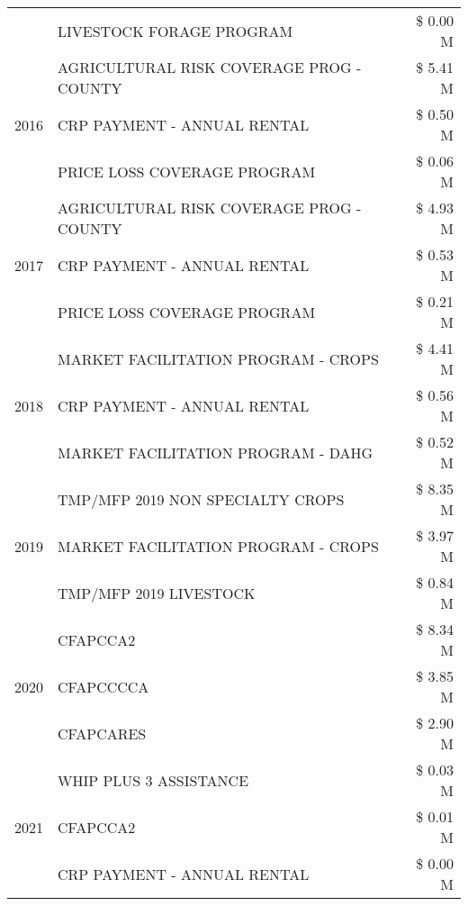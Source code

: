 \begin{tabular}{llr}
 & LIVESTOCK FORAGE PROGRAM & \$ 0.00 M \\
\cline{1-3}
\multirow[t]{3}{*}{2016} & AGRICULTURAL RISK COVERAGE PROG - COUNTY      & \$ 5.41 M \\
 & CRP PAYMENT - ANNUAL RENTAL                   & \$ 0.50 M \\
 & PRICE LOSS COVERAGE PROGRAM                   & \$ 0.06 M \\
\cline{1-3}
\multirow[t]{3}{*}{2017} & AGRICULTURAL RISK COVERAGE PROG - COUNTY & \$ 4.93 M \\
 & CRP PAYMENT - ANNUAL RENTAL & \$ 0.53 M \\
 & PRICE LOSS COVERAGE PROGRAM & \$ 0.21 M \\
\cline{1-3}
\multirow[t]{3}{*}{2018} & MARKET FACILITATION PROGRAM - CROPS & \$ 4.41 M \\
 & CRP PAYMENT - ANNUAL RENTAL & \$ 0.56 M \\
 & MARKET FACILITATION PROGRAM - DAHG & \$ 0.52 M \\
\cline{1-3}
\multirow[t]{3}{*}{2019} & TMP/MFP 2019 NON SPECIALTY CROPS & \$ 8.35 M \\
 & MARKET FACILITATION PROGRAM - CROPS & \$ 3.97 M \\
 & TMP/MFP 2019 LIVESTOCK & \$ 0.84 M \\
\cline{1-3}
\multirow[t]{3}{*}{2020} & CFAPCCA2 & \$ 8.34 M \\
 & CFAPCCCCA & \$ 3.85 M \\
 & CFAPCARES & \$ 2.90 M \\
\cline{1-3}
\multirow[t]{3}{*}{2021} & WHIP PLUS 3 ASSISTANCE & \$ 0.03 M \\
 & CFAPCCA2 & \$ 0.01 M \\
 & CRP PAYMENT - ANNUAL RENTAL & \$ 0.00 M \\
\cline{1-3}
\bottomrule
\end{tabular}
